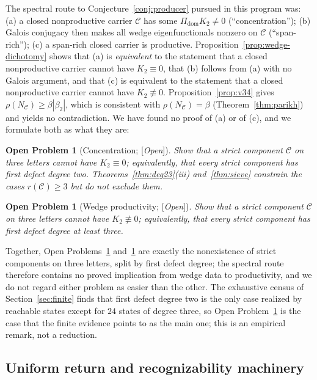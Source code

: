 \documentclass[11pt]{amsart}
\theoremstyle{plain}
\newtheorem{problem}[theorem]{Open Problem}
\theoremstyle{definition}
\theoremstyle{remark}
\newcommand{\cC}{\mathcal{C}}
\newcommand{\Status}[1]{\textup{[\textit{#1}]}}
\begin{document}
The spectral route to Conjecture~\ref{conj:producer} pursued in this program was: (a) a closed nonproductive carrier $\cC$ has some $\Pi_{\mathrm{dom}}K_2\ne0$ (``concentration''); (b) Galois conjugacy then makes all wedge eigenfunctionals nonzero on $\cC$ (``span-rich''); (c) a span-rich closed carrier is productive. Proposition~\ref{prop:wedge-dichotomy} shows that (a) is \emph{equivalent} to the statement that a closed nonproductive carrier cannot have $K_2\equiv0$, that (b) follows from (a) with no Galois argument, and that (c) is equivalent to the statement that a closed nonproductive carrier cannot have $K_2\not\equiv0$. Proposition~\ref{prop:v34} gives $\rho(N_\cC)\ge\beta|\beta_2|$, which is consistent with $\rho(N_\cC)=\beta$ (Theorem~\ref{thm:parikh}) and yields no contradiction. We have found no proof of (a) or of (c), and we formulate both as what they are:

\begin{problem}[Concentration; \Status{Open}]\label{prob:concentration}
Show that a strict component $\cC$ on three letters cannot have $K_2\equiv0$; equivalently, that every strict component has first defect degree two. Theorems~\ref{thm:deg23}(iii) and~\ref{thm:sieve} constrain the cases $r(\cC)\ge3$ but do not exclude them.
\end{problem}

\begin{problem}[Wedge productivity; \Status{Open}]\label{prob:wedge-productivity}
Show that a strict component $\cC$ on three letters cannot have $K_2\not\equiv0$; equivalently, that every strict component has first defect degree at least three.
\end{problem}

Together, Open Problems~\ref{prob:concentration} and~\ref{prob:wedge-productivity} are exactly the nonexistence of strict components on three letters, split by first defect degree; the spectral route therefore contains no proved implication from wedge data to productivity, and we do not regard either problem as easier than the other. The exhaustive census of Section~\ref{sec:finite} finds that first defect degree two is the only case realized by reachable states except for $24$ states of degree three, so Open Problem~\ref{prob:wedge-productivity} is the case that the finite evidence points to as the main one; this is an empirical remark, not a reduction.

\subsection{Uniform return and recognizability machinery}\label{sec:return-machinery}
\end{document}
